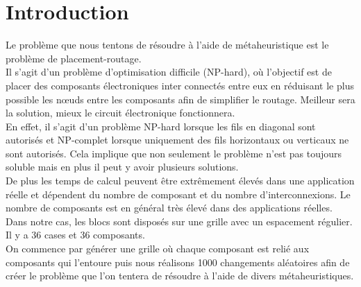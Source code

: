 \section{Introduction}

Le problème que nous tentons de résoudre à l'aide de métaheuristique est le problème de placement-routage. \\

Il s'agit d'un problème d'optimisation difficile (NP-hard), où l'objectif est de placer des composants électroniques inter connectés entre eux en réduisant le plus possible les nœuds entre les composants afin de simplifier le routage. Meilleur sera la solution, mieux le circuit électronique fonctionnera. \\

En effet, il s'agit d'un problème NP-hard lorsque les fils en diagonal sont autorisés et NP-complet lorsque uniquement des fils horizontaux ou verticaux ne sont autorisés. Cela implique que non seulement le problème n'est pas toujours soluble mais en plus il peut y avoir plusieurs solutions. \\

De plus les temps de calcul peuvent être extrêmement élevés dans une application réelle et dépendent du nombre de composant et du nombre d'interconnexions. Le nombre de composants est en général très élevé dans des applications réelles. \\

Dans notre cas, les blocs sont disposés sur une grille avec un espacement régulier. Il y a 36 cases et 36 composants.\\

On commence par générer une grille où chaque composant est relié aux composants qui l'entoure puis nous réalisons 1000 changements aléatoires afin de créer le problème que l'on tentera de résoudre à l'aide de divers métaheuristiques.

\newpage

